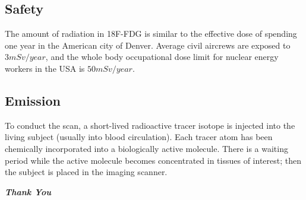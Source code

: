 \documentclass[12pt]{article}
\begin{document}
\subsection{Safety}
 The amount of radiation in 18F-FDG is similar to the effective dose of spending one year in the American city of Denver. Average civil aircrews are exposed to $3 mSv/year$, and the whole body occupational dose limit for nuclear energy workers in the USA is $50mSv/year$.
 
\subsection{Emission}
To conduct the scan, a short-lived radioactive tracer isotope is injected into the living subject (usually into blood circulation). \newline \newline
Each tracer atom has been chemically incorporated into a biologically active molecule. There is a waiting period while the active molecule becomes concentrated in tissues of interest; then the subject is placed in the imaging scanner.
\newline\newline\newline\newline\newline\newline\newline\newline\newline\newline\newline
\begin{center}
\textbf{\textsl{Thank You}}
\end{center}
\end{document}
